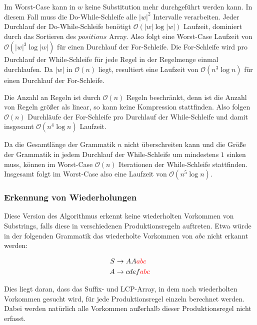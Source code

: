 Im Worst-Case kann in $w$ keine Substitution mehr durchgeführt werden kann. In diesem Fall muss die Do-While-Schleife alle $|w|^2$ Intervalle verarbeiten. Jeder Durchlauf der Do-While-Schleife benötigt $\mathcal{O}(|w| \log |w|)$ Laufzeit, dominiert durch das Sortieren des $positions$ Array. Also folgt eine Worst-Case Laufzeit von $\mathcal{O}(|w|^3 \log |w|)$ für einen Durchlauf der For-Schleife. Die For-Schleife wird pro Durchlauf der While-Schleife für jede Regel in der Regelmenge einmal durchlaufen. Da $|w|$ in $\mathcal{O}(n)$ liegt, resultiert eine Laufzeit von $\mathcal{O}(n^3 \log n)$ für einen Durchlauf der For-Schleife.

Die Anzahl an Regeln ist durch $\mathcal{O}(n)$ Regeln beschränkt, denn ist die Anzahl von Regeln größer als linear, so kann keine Kompression stattfinden. Also folgen $\mathcal{O}(n)$ Durchläufe der For-Schleife pro Durchlauf der While-Schleife und damit insgesamt $\mathcal{O}(n^4 \log n)$ Laufzeit.

Da die Gesamtlänge der Grammatik $n$ nicht überschreiten kann und die Größe der Grammatik in jedem Durchlauf der While-Schleife um mindestens $1$ sinken muss, können im Worst-Case $\mathcal{O}(n)$ Iterationen der While-Schleife stattfinden. Insgesamt folgt im Worst-Case also eine Laufzeit von $\mathcal{O}(n^5 \log n)$.


\subsubsection{Erkennung von Wiederholungen}

Diese Version des Algorithmus erkennt keine wiederholten Vorkommen von Substrings, falls diese in verschiedenen Produktionsregeln auftreten.
Etwa würde in der folgenden Grammatik das wiederholte Vorkommen von $abc$ nicht erkannt werden:

\begin{align*}
	S &\rightarrow AA\textcolor{red}{abc}\\
	A &\rightarrow cdef\textcolor{red}{abc}
\end{align*}

Dies liegt daran, dass das Suffix- und LCP-Array, in dem nach wiederholten Vorkommen gesucht wird, für jede Produktionsregel einzeln berechnet werden. Dabei werden natürlich alle Vorkommen außerhalb dieser Produktionsregel nicht erfasst.